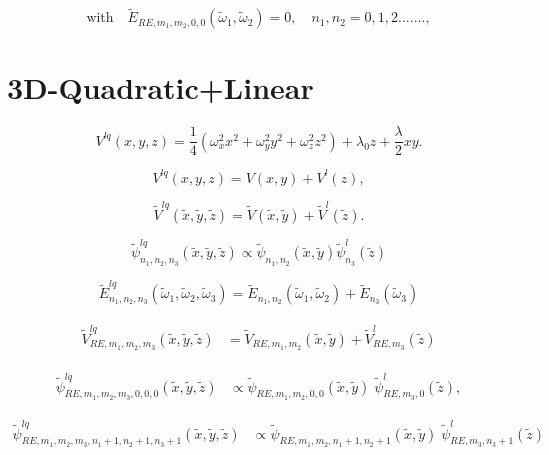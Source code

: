 \documentclass[12pt]{article}
\newcommand{\td}[1]{\tilde{#1}}
\begin{document}
\begin{equation}
	\mbox{with} \quad \td{E}_{RE,m_1,m_2,0,0}(\td{\omega}_{1},\td{\omega}_{2}) =0, \quad n_1, n_2=0,1,2.......,\nonumber
\end{equation}



\section*{3D-Quadratic+Linear}

\begin{equation}\label{3D-V-III}
V^{lq}(x,y,z) = \frac{1}{4} \left(\omega_{x}^2 x^2 + \omega_{y}^2 y^2 + \omega_{z}^2 z^2\right) + \lambda_{0} z + \frac{\lambda}{2} xy.
\end{equation}

\begin{equation}
  V^{lq}(x, y, z) =  V(x, y)+ V^l(z),
\end{equation}

\begin{equation}
	\td{V}^{lq}(\td{x}, \td{y}, \td{z}) =  \td{V}(\td{x}, \td{y})+ \td{V}^l(\td{z}).
\end{equation}

\begin{equation}\label{lq_ef}
  \td{\psi}^{lq}_{n_1, n_2, n_3}(\td{x}, \td{y}, \td{z}) \propto \td{\psi}_{n_1, n_2}(\td{x}, \td{y}) \td{\psi}^l_{n_3}( \td{z})
\end{equation}

\begin{equation}\label{lq_en}
  \td{E}^{lq}_{n_1, n_2, n_3}(\td{\omega}_1, \td{\omega}_2, \td{\omega}_3) = \td{E}_{n_1, n_2}(\td{\omega}_1, \td{\omega}_2) + \td{E}_{n_3}(\td{\omega}_3)
\end{equation}

\begin{align}
  \begin{split}
    \td{V}^{lq}_{RE,m_1,m_2,m_3}(\td{x}, \td{y}, \td{z}) &= \td{V}_{RE,m_1,m_2}(\td{x}, \td{y})+\td{V}^l_{RE,m_3}(\td{z})
  \end{split}
\end{align}

\begin{align}
	\td{\psi}^{lq}_{RE,m_1,m_2,m_3,0,0,0}(\td{x}, \td{y}, \td{z})&\propto \td{\psi}_{RE,m_1,m_2,0,0}(\td{x}, \td{y})\;\td{\psi}^l_{RE,m_3,0}(\td{z}),
\end{align}

\begin{align}
  \td{\psi}^{lq}_{RE,m_1,m_2,m_3,n_1+1,n_2+1,n_3+1}(\td{x}, \td{y}, \td{z})&\propto \td{\psi}_{RE,m_1,m_2,n_1+1,n_2+1}(\td{x}, \td{y})\;\td{\psi}^l_{RE,m_3,n_3+1}(\td{z})
\end{align}
\end{document}
